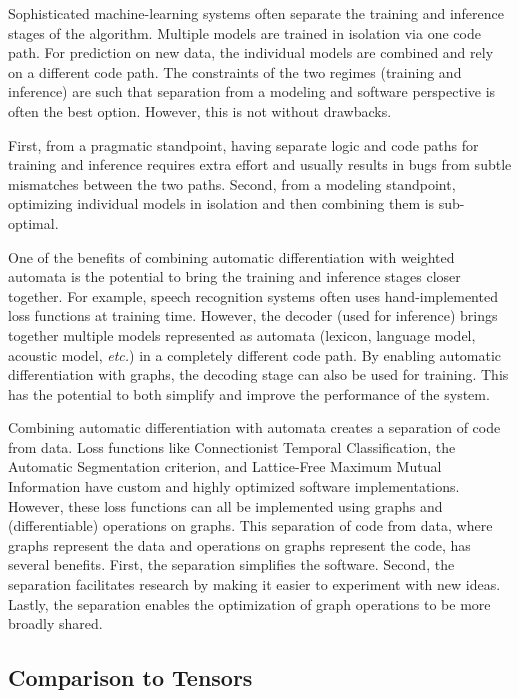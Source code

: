 Sophisticated machine-learning systems often separate the training and
inference stages of the algorithm. Multiple models are trained in isolation via
one code path. For prediction on new data, the individual models are combined
and rely on a different code path. The constraints of the two regimes (training
and inference) are such that separation from a modeling and software
perspective is often the best option. However, this is not without drawbacks.

First, from a pragmatic standpoint, having separate logic and code paths for
training and inference requires extra effort and usually results in bugs from
subtle mismatches between the two paths. Second, from a modeling standpoint,
optimizing individual models in isolation and then combining them is
sub-optimal.

One of the benefits of combining automatic differentiation with weighted
automata is the potential to bring the training and inference stages closer
together. For example, speech recognition systems often uses hand-implemented
loss functions at training time. However, the decoder (used for inference)
brings together multiple models represented as automata (lexicon, language model,
acoustic model, \emph{etc.}) in a completely different code path. By enabling
automatic differentiation with graphs, the decoding stage can also be used for
training. This has the potential to both simplify and improve the performance
of the system.

Combining automatic differentiation with automata creates a separation of code
from data. Loss functions like Connectionist Temporal Classification, the
Automatic Segmentation criterion, and Lattice-Free Maximum Mutual Information
have custom and highly optimized software implementations. However, these loss
functions can all be implemented using graphs and (differentiable) operations
on graphs. This separation of code from data, where graphs represent the data
and operations on graphs represent the code, has several benefits. First, the
separation simplifies the software. Second, the separation facilitates research
by making it easier to experiment with new ideas. Lastly, the separation
enables the optimization of graph operations to be more broadly shared.

\subsection{Comparison to Tensors}
\label{sec:comparison_to_tensors}

